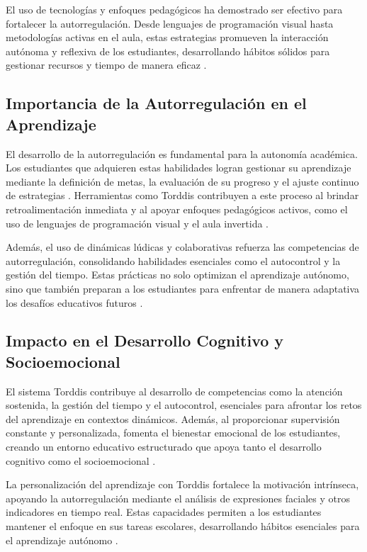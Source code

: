 \documentclass[a4paper,fleqn]{cas-sc}
\begin{document}
			El uso de tecnologías y enfoques pedagógicos ha demostrado ser efectivo para fortalecer la autorregulación. Desde lenguajes de programación visual hasta metodologías activas en el aula, estas estrategias promueven la interacción autónoma y reflexiva de los estudiantes, desarrollando hábitos sólidos para gestionar recursos y tiempo de manera eficaz \citep{SaezLopez2016Visual,Mohamed2018Implementing,Palioura2025Storylling}.
		
		\subsection{Importancia de la Autorregulación en el Aprendizaje}
			El desarrollo de la autorregulación es fundamental para la autonomía académica. Los estudiantes que adquieren estas habilidades logran gestionar su aprendizaje mediante la definición de metas, la evaluación de su progreso y el ajuste continuo de estrategias \citep{Taber2024Developing}. Herramientas como Torddis contribuyen a este proceso al brindar retroalimentación inmediata y al apoyar enfoques pedagógicos activos, como el uso de lenguajes de programación visual y el aula invertida \citep{Mohamed2018Implementing,SaezLopez2016Visual}.
			
			Además, el uso de dinámicas lúdicas y colaborativas refuerza las competencias de autorregulación, consolidando habilidades esenciales como el autocontrol y la gestión del tiempo. Estas prácticas no solo optimizan el aprendizaje autónomo, sino que también preparan a los estudiantes para enfrentar de manera adaptativa los desafíos educativos futuros \citep{Echeverria2011AFramework}.

		\subsection{Impacto en el Desarrollo Cognitivo y Socioemocional}		
			El sistema Torddis contribuye al desarrollo de competencias como la atención sostenida, la gestión del tiempo y el autocontrol, esenciales para afrontar los retos del aprendizaje en contextos dinámicos. Además, al proporcionar supervisión constante y personalizada, fomenta el bienestar emocional de los estudiantes, creando un entorno educativo estructurado que apoya tanto el desarrollo cognitivo como el socioemocional \citep{SaezLopez2016Visual,Mohamed2018Implementing,Navarro2024}.
		
			La personalización del aprendizaje con Torddis fortalece la motivación intrínseca, apoyando la autorregulación mediante el análisis de expresiones faciales y otros indicadores en tiempo real. Estas capacidades permiten a los estudiantes mantener el enfoque en sus tareas escolares, desarrollando hábitos esenciales para el aprendizaje autónomo \citep{Ackermans2025Young}.
		
\end{document}
